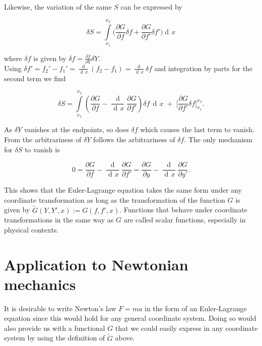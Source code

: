 \documentclass{article}
\DeclareMathOperator{\dd}{d\!}
\DeclareMathOperator{\ddd}{\mathrm{d}}
\begin{document}
Likewise, the variation of the same $S$ can be expressed by

\begin{equation}
\delta S = \int\limits_{x_1}^{x_2} \bigg( \frac{\partial G}{\partial f} \delta f
+ \frac{\partial G}{\partial f'} \delta f' \bigg) \dd x
\end{equation}

where $\delta f$ is given by $\delta f = \frac{\partial f}{\partial Y} \delta Y$. \\


Using $\delta f' = f_2' - f_1' = \frac{\ddd}{\dd x}(f_2 - f_1) = \frac{\dd}{\dd x} \delta f$ and integration by parts for the second term we find


\begin{equation}
\delta S = \int\limits_{x_1}^{x_2} \left( \frac{\partial G}{\partial f}
- \frac{\ddd}{\dd x} \frac{\partial G}{\partial f'} \right) \delta f \, \dd x \;
+ \; \bigg[\frac{\partial G}{\partial f'} \delta f \bigg]_{x_1}^{x_2}.
\end{equation}


As $\delta Y$ vanishes at the endpoints, so does $\delta f$ which causes the last term to vanish. From the arbitrariness of $\delta Y$ follows the arbitrariness of $\delta f$. The only mechanism for $\delta S$ to vanish is

\begin{equation}
0 = \frac{\partial G}{\partial f} - \frac{\ddd}{\dd x} \frac{\partial G}{\partial f'}
= \frac{\partial G}{\partial y} - \frac{\ddd}{\dd x} \frac{\partial G}{\partial y'}.
\end{equation}

This shows that the Euler-Lagrange equation takes the same form under any coordinate transformation as long as the transformation of the function $G$ is given by $\widetilde{G}(Y,Y',x) := G(f,f',x)$. Functions that behave under coordinate transformations in the same way as $G$ are called scalar functions, especially in physical contexts.

\section{Application to Newtonian mechanics \cite{Guthrie}} %


It is desirable to write Newton's law $F=ma$ in the form of an Euler-Lagrange equation since this would hold for any general coordinate system. Doing so would also provide us with a functional $G$ that we could easily express in any coordinate system by using the definition of $\widetilde{G}$ above.\\
\end{document}
